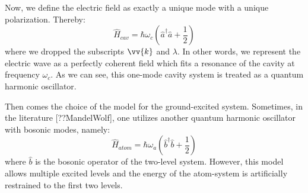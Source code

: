 \documentclass[11pt]{report}
\begin{document}
Now, we define the electric field as exactly a unique mode with a unique polarization. Thereby:
\begin{equation}
\hat{H}_{cav} = \hbar \omega_c \left( \hat{a}^\dag \hat{a} + \frac{1}{2} \right)
\end{equation}
where we dropped the subscripts $\vv{k}$ and $\lambda$. In other words, we represent the electric wave as a perfectly coherent field which fits a resonance of the cavity at frequency $\omega_c$. As we can see, this one-mode cavity system is treated as a quantum harmonic oscillator.

Then comes the choice of the model for the ground-excited system. Sometimes, in the literature [??MandelWolf], one utilizes another quantum harmonic oscillator with bosonic modes, namely:
\begin{equation}
\label{sec_bosonic_mw}
\hat{H}_{atom} = \hbar \omega_a \left( \hat{b}^\dag \hat{b} + \frac{1}{2} \right)
\end{equation}
where $\hat{b}$ is the bosonic operator of the two-level system. However, this model allows multiple excited levels and the energy of the atom-system is artificially restrained to the first two levels.
\end{document}
